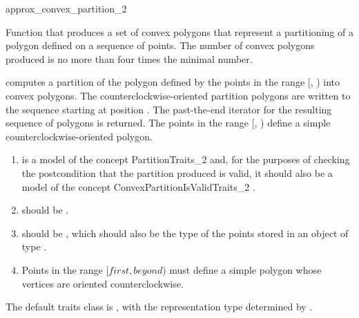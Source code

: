 \begin{ccRefFunction}{approx_convex_partition_2}

\ccDefinition
Function that produces a set of 
convex polygons that represent a partitioning of a polygon defined
on a sequence of points.  The number of convex polygons produced is 
no more than four times the minimal number.%



{
computes a partition of the polygon defined 
by the points in the range [, ) into convex 
polygons. The counterclockwise-oriented partition polygons are written to
the sequence starting at position .  The past-the-end iterator for 
the resulting sequence of polygons is returned.
\ccPrecond The points in the range [, ) define a simple 
counterclockwise-oriented polygon.
}

\begin{enumerate}
    \item {} is a model of the concept 
          PartitionTraits\_2
          and, for the purposes of checking the postcondition that the partition
          produced is valid, it should also be a model of
          the concept ConvexPartitionIsValidTraits\_2%
          .
    \item {} should be .
    \item {} should be ,
          which should also be the type of the points stored in an object
          of type .
    \item Points in the range $[first, beyond)$ must define a simple polygon
          whose vertices are oriented counterclockwise.
\end{enumerate}

The default traits class  is ,
with the representation type determined by .


\end{ccRefFunction}

